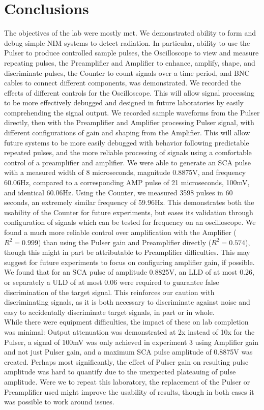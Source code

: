 \documentclass[12pt]{article}
\begin{document}
\section{Conclusions}\label{sec:conc}
The objectives of the lab\cite{npre_lab_1_manual_2025} were mostly met.
We demonstrated ability to form and debug simple NIM systems to detect radiation.
In particular, ability to use the Pulser to produce controlled sample pulses, the Oscilloscope to view and measure repeating pulses, the Preamplifier and Amplifier to enhance, amplify, shape, and discriminate pulses, the Counter to count signals over a time period, and BNC cables to connect different components, was demonstrated.
We recorded the effects of different controls for the Oscilloscope.
This will allow signal processing to be more effectively debugged and designed in future laboratories by easily comprehending the signal output.
We recorded sample waveforms from the Pulser directly, then with the Preamplifier and Amplifier processing Pulser signal, with different configurations of gain and shaping from the Amplifier.
This will allow future systems to be more easily debugged with behavior following predictable repeated pulses, and the more reliable processing of signals using a comfortable control of a preamplifier and amplifier.
We were able to generate an SCA pulse with a measured width of 8 microseconds, magnitude 0.8875V, and frequency 60.06Hz, compared to a corresponding AMP pulse of 21 microseconds, 100mV, and identical 60.06Hz.
Using the Counter, we measured 3598 pulses in 60 seconds, an extremely similar frequency of 59.96Hz.
This demonstrates both the usability of the Counter for future experiments, but eases its validation through configuration of signals which can be tested for frequency on an oscilloscope.
We found a much more reliable control over amplification with the Amplifier ($R^2=0.999$) than using the Pulser gain and Preamplifier directly ($R^2=0.574$), though this might in part be attributable to Preamplifier difficulties.
This may suggest for future experiments to focus on configuring amplifier gain, if possible.
We found that for an SCA pulse of amplitude 0.8825V, an LLD of at most 0.26, or separately a ULD of at most 0.06 were required to guarantee false discrimination of the target signal.
This reinforces our caution with discriminating signals, as it is both necessary to discriminate against noise and easy to accidentally discriminate target signals, in part or in whole.\\

While there were equipment difficulties, the impact of these on lab completion was minimal: Output attenuation was demonstrated at 2x instead of 10x for the Pulser, a signal of 100mV was only achieved in experiment 3 using Amplifier gain and not just Pulser gain, and a maximum SCA pulse amplitude of 0.8875V was created.
Perhaps most significantly, the effect of Pulser gain on resulting pulse amplitude was hard to quantify due to the unexpected plateauing of pulse amplitude. 
Were we to repeat this laboratory, the replacement of the Pulser or Preamplifier used might improve the usability of results, though in both cases it was possible to work around issues.

% 
\printbibliography
\end{document}
